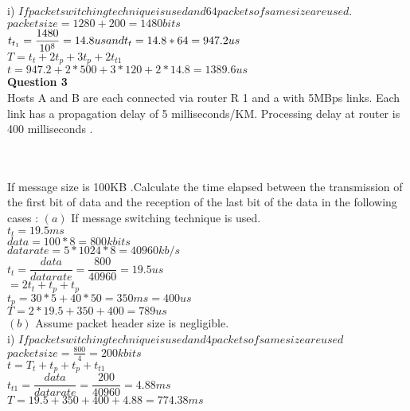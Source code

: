 \documentclass[a4paper,12pt]{article}
\begin{document}
i) $ If packet switching technique is used and 64 packets of same size are used.$\\

$ packet size =1280+200=1480 bits $\\
$ t_{t_{1}}=\dfrac{1480}{10^{8}}=14.8 \\us and t_{t}=14.8*64=947.2 us $\\
$ T = t_{t}+2t_{p}+3t_{p}+2t_{t1} $\\
$ t = 947.2+2*500+3*120+2*14.8=1389.6 us $\\




 \textbf{Question 3}\\ Hosts A and B are each connected via router R 1 and a with 5MBps links. Each link has a
propagation delay of 5 milliseconds/KM. Processing delay at router is 400 milliseconds .


\\\\


If message size is 100KB .Calculate the time elapsed between the transmission of the first
bit of data and the reception of the last bit of the data in the following cases :
$ (a) $ If message switching technique is used.\\

 $ t_{t}=19.5 ms $\\
$ data =100*8=800 kbits$\\
$ data rate=5*1024*8=40960kb/s $\\

$ t_{t}= \dfrac{data}{data rate}=\dfrac{800}{40960}=19.5 us $\\
$ =2t_{t} +t_{p}+t_{p} $\\
$ t_{p}=30*5+40*50=350 ms=400us $\\
$ T =2*19.5+350+400=789 us$\\


$ (b)$ Assume packet header size is negligible.\\

i) $If packet switching technique is used and 4 packets of same size are used $\\

$ packet size =\frac{800}{4}=200kbits $\\
$ t = T_{t}+t_{p}+t_{p}+t_{t1}$\\
$ t_{t1}=\dfrac{data}{data rate}=\dfrac{200}{40960}=4.88 ms $\\
$ T = 19.5+350+400+4.88=774.38ms $\\
\end{document}
